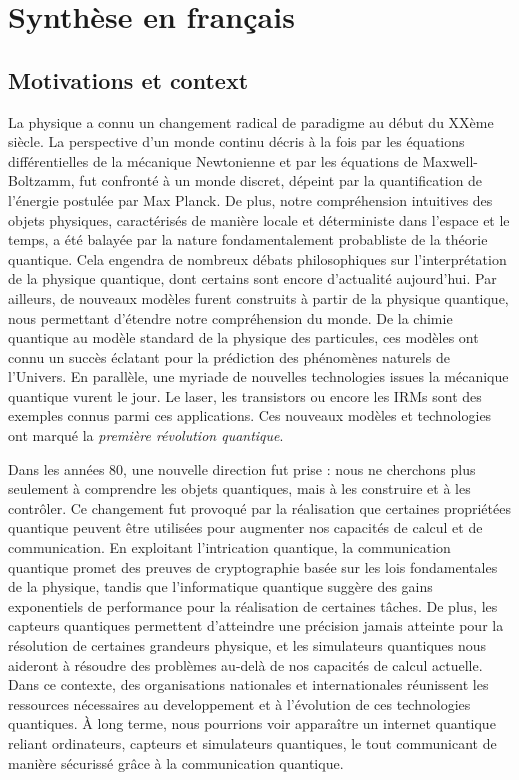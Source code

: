 \chapter{Synthèse en français}

\section{Motivations et context}

La physique a connu un changement radical de paradigme au début du XXème siècle.
La perspective d'un monde continu décris à la fois par les équations différentielles de la mécanique Newtonienne et par les équations de Maxwell-Boltzamm, fut confronté à un monde discret, dépeint par la quantification de l'énergie postulée par Max Planck.
De plus, notre compréhension intuitives des objets physiques, caractérisés de manière locale et déterministe dans l'espace et le temps, a été balayée par la nature fondamentalement probabliste de la théorie quantique.
Cela engendra de nombreux débats philosophiques sur l'interprétation de la physique quantique, dont certains sont encore d'actualité aujourd'hui.
Par ailleurs, de nouveaux modèles furent construits à partir de la physique quantique, nous permettant d'étendre notre compréhension du monde.
De la chimie quantique au modèle standard de la physique des particules, ces modèles ont connu un succès éclatant pour la prédiction des phénomènes naturels de l'Univers.
En parallèle, une myriade de nouvelles technologies issues la mécanique quantique vurent le jour.
Le laser, les transistors ou encore les IRMs sont des exemples connus parmi ces applications.
Ces nouveaux modèles et technologies ont marqué la \textit{première révolution quantique}.

\medbreak

Dans les années 80, une nouvelle direction fut prise : nous ne cherchons plus seulement à comprendre les objets quantiques, mais à les construire et à les contrôler.
Ce changement fut provoqué par la réalisation que certaines propriétées quantique peuvent être utilisées pour augmenter nos capacités de calcul et de communication.
En exploitant l'intrication quantique, la communication quantique promet des preuves de cryptographie basée sur les lois fondamentales de la physique, tandis que l'informatique quantique suggère des gains exponentiels de performance pour la réalisation de certaines tâches.
De plus, les capteurs quantiques permettent d'atteindre une précision jamais atteinte pour la résolution de certaines grandeurs physique, et les simulateurs quantiques nous aideront à résoudre des problèmes au-delà de nos capacités de calcul actuelle.
Dans ce contexte, des organisations nationales et internationales réunissent les ressources nécessaires au developpement et à l'évolution de ces technologies quantiques.
À long terme, nous pourrions voir apparaître un internet quantique reliant ordinateurs, capteurs et simulateurs quantiques, le tout communicant de manière sécurissé grâce à la communication quantique.

